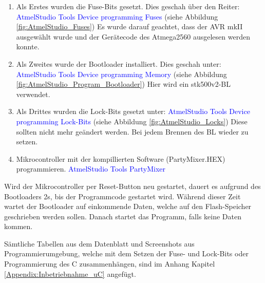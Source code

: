 \begin{enumerate}
\item Als Erstes wurden die Fuse-Bits gesetzt. Dies geschah über den Reiter:\newline
\textcolor{blue}{AtmelStudio \textrightarrow Tools \textrightarrow Device programming \textrightarrow Fuses} (siehe Abbildung \ref{fig:AtmelStudio_Fuses}) \newline
Es wurde darauf geachtet, dass der AVR mkII ausgewählt wurde und der Gerätecode des Atmega2560 ausgelesen werden konnte.\newline

\item Als Zweites wurde der Bootloader installiert. Dies geschah unter:\newline
\textcolor{blue}{AtmelStudio \textrightarrow Tools \textrightarrow Device programming \textrightarrow Memory} (siehe Abbildung \ref{fig:AtmelStudio_Program_Bootloader}) \newline
Hier wird ein stk500v2-BL verwendet.\newline
\item Als Drittes wurden die Lock-Bits gesetzt unter:\newline
\textcolor{blue}{AtmelStudio \textrightarrow Tools \textrightarrow Device programming \textrightarrow Lock-Bits} (siehe Abbildung \ref{fig:AtmelStudio_Locks})\newline
Diese sollten nicht mehr geändert werden. Bei jedem Brennen des BL wieder zu setzen.\newline
\item Mikrocontroller mit der kompillierten Software (PartyMixer.HEX) programmieren.\newline
\textcolor{blue}{AtmelStudio \textrightarrow Tools \textrightarrow PartyMixer}\newline
\end{enumerate}


Wird der Mikrocontroller per Reset-Button neu gestartet, dauert es aufgrund des Bootloaders 2s, bis der Programmcode gestartet wird. Während dieser Zeit wartet der Bootloader auf einkommende Daten, welche auf den Flash-Speicher geschrieben werden sollen. Danach startet das Programm, falls keine Daten kommen.

Sämtliche Tabellen aus dem Datenblatt und Screenshots aus Programmierumgebung, welche mit dem Setzen der Fuse- und Lock-Bits oder Programmierung des \textmu C zusammenhängen, sind im Anhang Kapitel \ref{Appendix:Inbetriebnahme_uC} angefügt.